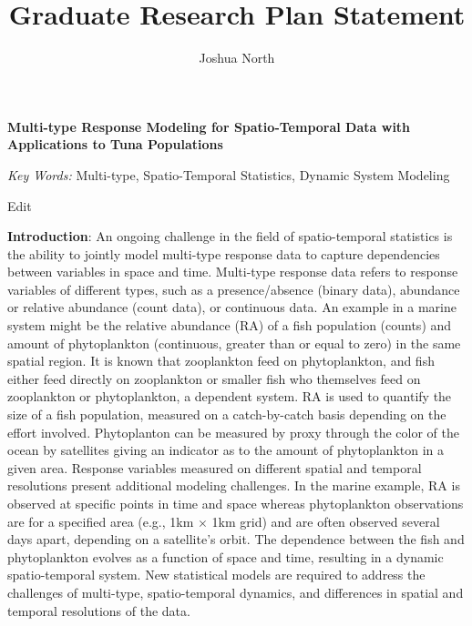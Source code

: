 \documentclass[12pt]{article}
\title{Graduate Research Plan Statement}
\author{Joshua North}
\makeatletter
\renewcommand{\maketitle}{\bgroup\setlength{\parindent}{0pt}
\begin{flushleft}
    \@title

    \@author
    
    \@date
\end{flushleft}\egroup
}
\makeatother
\begin{document}


\begin{center}
    \textbf{Multi-type Response Modeling for Spatio-Temporal Data with Applications to Tuna Populations}
\end{center}

\noindent \textit{Key Words:} Multi-type, Spatio-Temporal Statistics, Dynamic System Modeling

\vspace{2mm}


\Huge{Edit}


\noindent \textbf{Introduction}: An ongoing challenge in the field of spatio-temporal statistics is the ability to jointly model multi-type response data to capture dependencies between variables in space and time. Multi-type response data refers to response variables of different types, such as a presence/absence (binary data), abundance or relative abundance (count data), or continuous data. An example in a marine system might be the relative abundance (RA) of a fish population (counts) and amount of phytoplankton (continuous, greater than or equal to zero) in the same spatial region. It is known that zooplankton feed on phytoplankton, and fish either feed directly on zooplankton or smaller fish who themselves feed on zooplankton or phytoplankton, a dependent system. RA is used to quantify the size of a fish population, measured on a catch-by-catch basis depending on the effort involved. Phytoplanton can be measured by proxy through the color of the ocean by satellites giving an indicator as to the amount of phytoplankton in a given area. Response variables measured on different spatial and temporal resolutions present additional modeling challenges. In the marine example, RA is observed at specific points in time and space whereas phytoplankton observations are for a specified area (e.g., 1km $\times$ 1km grid) and are often observed several days apart, depending on a satellite’s orbit. The dependence between the fish and phytoplankton evolves as a function of space and time, resulting in a dynamic spatio-temporal system. New statistical models are required to address the challenges of multi-type, spatio-temporal dynamics, and differences in spatial and temporal resolutions of the data.
\end{document}
